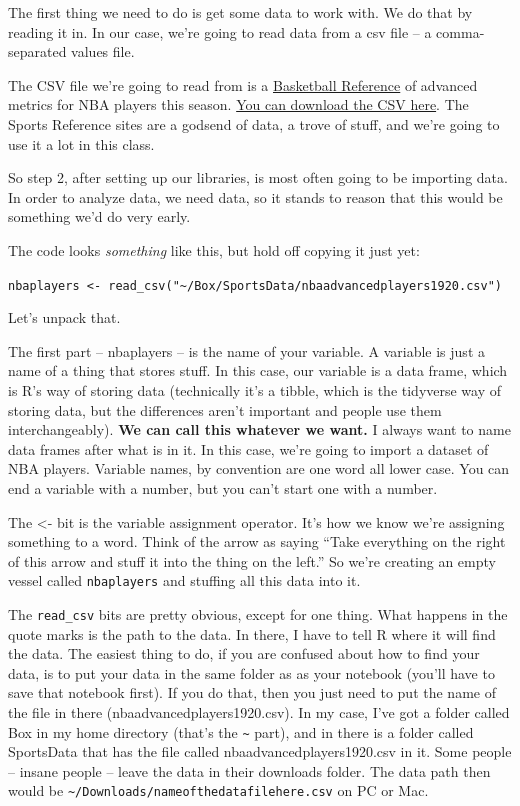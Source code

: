 \documentclass[
]{book}
\begin{document}
The first thing we need to do is get some data to work with. We do that by reading it in. In our case, we're going to read data from a csv file -- a comma-separated values file.

The CSV file we're going to read from is a \href{https://www.basketball-reference.com/leagues/NBA_2020_advanced.html}{Basketball Reference} of advanced metrics for NBA players this season. \href{https://unl.box.com/s/5v1d70ab0xyaajkolynd54a1t4p38b3v}{You can download the CSV here}. The Sports Reference sites are a godsend of data, a trove of stuff, and we're going to use it a lot in this class.

So step 2, after setting up our libraries, is most often going to be importing data. In order to analyze data, we need data, so it stands to reason that this would be something we'd do very early.

The code looks \emph{something} like this, but hold off copying it just yet:

\texttt{nbaplayers\ \textless{}-\ read\_csv("\textasciitilde{}/Box/SportsData/nbaadvancedplayers1920.csv")}

Let's unpack that.

The first part -- nbaplayers -- is the name of your variable. A variable is just a name of a thing that stores stuff. In this case, our variable is a data frame, which is R's way of storing data (technically it's a tibble, which is the tidyverse way of storing data, but the differences aren't important and people use them interchangeably). \textbf{We can call this whatever we want.} I always want to name data frames after what is in it. In this case, we're going to import a dataset of NBA players. Variable names, by convention are one word all lower case. You can end a variable with a number, but you can't start one with a number.

The \textless- bit is the variable assignment operator. It's how we know we're assigning something to a word. Think of the arrow as saying ``Take everything on the right of this arrow and stuff it into the thing on the left.'' So we're creating an empty vessel called \texttt{nbaplayers} and stuffing all this data into it.

The \texttt{read\_csv} bits are pretty obvious, except for one thing. What happens in the quote marks is the path to the data. In there, I have to tell R where it will find the data. The easiest thing to do, if you are confused about how to find your data, is to put your data in the same folder as as your notebook (you'll have to save that notebook first). If you do that, then you just need to put the name of the file in there (nbaadvancedplayers1920.csv). In my case, I've got a folder called Box in my home directory (that's the \texttt{\textasciitilde{}} part), and in there is a folder called SportsData that has the file called nbaadvancedplayers1920.csv in it. Some people -- insane people -- leave the data in their downloads folder. The data path then would be \texttt{\textasciitilde{}/Downloads/nameofthedatafilehere.csv} on PC or Mac.
\end{document}
